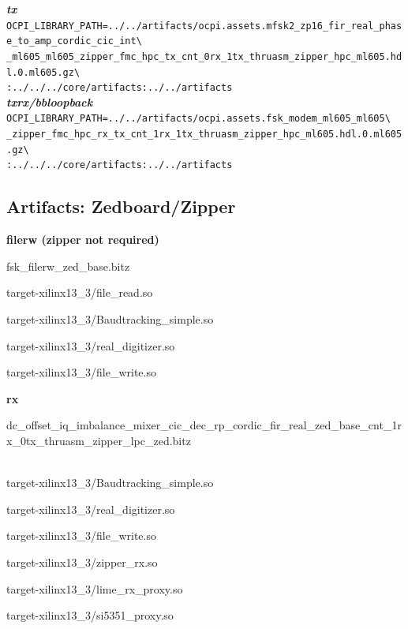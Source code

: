 \noindent\textbf{\textit{tx}}\\
\verb|OCPI_LIBRARY_PATH=../../artifacts/ocpi.assets.mfsk2_zp16_fir_real_phase_to_amp_cordic_cic_int\| \\
\verb|_ml605_ml605_zipper_fmc_hpc_tx_cnt_0rx_1tx_thruasm_zipper_hpc_ml605.hdl.0.ml605.gz\| \\
\verb|:../../../core/artifacts:../../artifacts| \\

\noindent\textbf{\textit{txrx/bbloopback}}\\
\verb|OCPI_LIBRARY_PATH=../../artifacts/ocpi.assets.fsk_modem_ml605_ml605\| \\
\verb|_zipper_fmc_hpc_rx_tx_cnt_1rx_1tx_thruasm_zipper_hpc_ml605.hdl.0.ml605.gz\| \\
\verb|:../../../core/artifacts:../../artifacts| \\


\pagebreak

\subsection{Artifacts: Zedboard/Zipper}
	\noindent\textbf{filerw (zipper not required)}
	\begin{itemize}
	\begin{minipage}[t]{.5\textwidth}
	\item fsk\_filerw\_zed\_base.bitz
	\item target-xilinx13\_3/file\_read.so
	\item target-xilinx13\_3/Baudtracking\_simple.so
	\end{minipage}
	\begin{minipage}[t]{.5\textwidth}
	\item target-xilinx13\_3/real\_digitizer.so
	\item target-xilinx13\_3/file\_write.so
	\end{minipage}
	\end{itemize}

	\noindent\textbf{rx}
	\begin{itemize}
	\item dc\_offset\_iq\_imbalance\_mixer\_cic\_dec\_rp\_cordic\_fir\_real\_zed\_base\_cnt\_1rx\_0tx\_thruasm\_zipper\_lpc\_zed.bitz \\ \\
	\begin{minipage}[t]{.5\textwidth}
	\item target-xilinx13\_3/Baudtracking\_simple.so
	\item target-xilinx13\_3/real\_digitizer.so
	\item target-xilinx13\_3/file\_write.so
	\end{minipage}
	\begin{minipage}[t]{.5\textwidth}
	\item target-xilinx13\_3/zipper\_rx.so
	\item target-xilinx13\_3/lime\_rx\_proxy.so
	\item target-xilinx13\_3/si5351\_proxy.so
	\end{minipage}
	\end{itemize}

